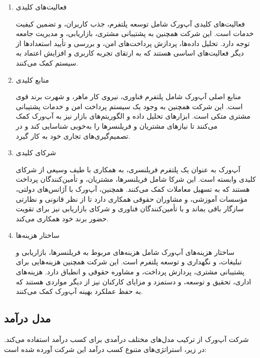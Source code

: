 \documentclass[dvipsnames, svgnames, x11names, 11pt, twocolumn]{article}
\begin{document}
\begin{enumerate}
\item 
فعالیت‌های کلیدی 

فعالیت‌های کلیدی آپ‌ورک شامل توسعه پلتفرم، جذب کاربران، و تضمین کیفیت خدمات است. این شرکت همچنین به پشتیبانی مشتری، بازاریابی، و مدیریت جامعه توجه دارد. تحلیل داده‌ها، پردازش پرداخت‌های امن، و بررسی و تأیید استعدادها از دیگر فعالیت‌های اساسی هستند که به ارتقای تجربه کاربری و افزایش اعتماد به سیستم کمک می‌کنند.

\item
منابع کلیدی 

منابع اصلی آپ‌ورک شامل پلتفرم فناوری، نیروی کار ماهر، و شهرت برند قوی است. این شرکت همچنین به وجود یک سیستم پرداخت امن و خدمات پشتیبانی مشتری متکی است. ابزارهای تحلیل داده و الگوریتم‌های بازار نیز به آپ‌ورک کمک می‌کنند تا نیازهای مشتریان و فریلنسرها را به‌خوبی شناسایی کند و در تصمیم‌گیری‌های تجاری خود به کار گیرد.


\item
شرکای کلیدی 

آپ‌ورک به عنوان یک پلتفرم فریلنسری، به همکاری با طیف وسیعی از شرکای کلیدی وابسته است. این شرکا شامل فریلنسرها، مشتریان، و تأمین‌کنندگان پرداخت هستند که به تسهیل معاملات کمک می‌کنند. همچنین، آپ‌ورک با آژانس‌های دولتی، مؤسسات آموزشی، و مشاوران حقوقی همکاری دارد تا از نظر قانونی و نظارتی سازگار باقی بماند و با تأمین‌کنندگان فناوری و شرکای بازاریابی نیز برای تقویت حضور برند خود همکاری می‌کند.

\item
ساختار هزینه‌ها 

ساختار هزینه‌های آپ‌ورک شامل هزینه‌های مربوط به فریلنسرها، بازاریابی و تبلیغات، و نگهداری و توسعه پلتفرم است. این شرکت همچنین هزینه‌هایی برای پشتیبانی مشتری، پردازش پرداخت، و مشاوره حقوقی و انطباق دارد. هزینه‌های اداری، تحقیق و توسعه، و دستمزد و مزایای کارکنان نیز از دیگر مواردی هستند که به حفظ عملکرد بهینه آپ‌ورک کمک می‌کنند.
\end{enumerate}

\subsection{مدل درآمد}
شرکت آپ‌ورک از ترکیب مدل‌های مختلف درآمدی برای کسب درآمد استفاده می‌کند. در زیر، استراتژی‌های متنوع کسب درآمد این شرکت آورده شده است:
\end{document}
